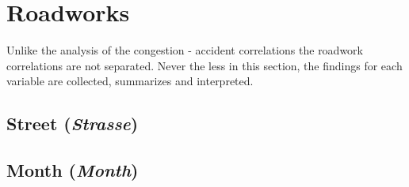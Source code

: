 \section{Roadworks}
Unlike the analysis of the congestion - accident correlations the roadwork correlations are not separated. Never the less in this section, the findings for each variable are collected, summarizes and interpreted. 

\subsection{Street (\textit{Strasse})}

\subsection{Month (\textit{Month})}



